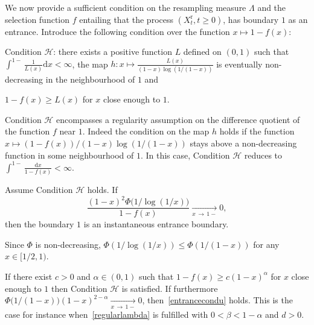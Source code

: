 \documentclass[AHL,Unicode,longabstracts,published]{cedram}
\newcommand{\ddr}{\mathrm{d}}
\newcommand{\rmr}{\mathrm{r}}
\newcommand{\clH}{\mathcal{H}}
\begin{document}
We now provide a sufficient condition on the resampling measure $\Lambda$ and the selection function $f$ entailing that the process $(X_t^{\rmr},t\geq 0)$, has boundary $1$ as an entrance. Introduce the following condition over the function $x\mapsto 1-f(x)$:

\begin{enonce*}{Condition}
$\clH$: there exists a positive function $L$ defined on $(0,1)$ such that $\int^{1-} \frac{1}{L(x)}\ddr x<\infty$, the map $h:x\mapsto \frac{L(x)}{(1-x)\log\left(1/(1-x)\right)}$ is eventually non-decreasing in the neighbourhood of $1$ and
\begin{center} 
$1-f(x)\geq L(x)$ for $x$ close enough to $1$.
\end{center}
\end{enonce*}

\begin{rema}
Condition $\clH$ encompasses a regularity assumption on the difference quotient of the function $f$ near $1$. Indeed the condition on the map $h$ holds if the function $x\mapsto (1-f(x))/(1-x)\log(1/(1-x))$ stays above a non-decreasing function in some neighbourhood of $1$. In this case, Condition $\clH$ reduces to $\int^{1-}\frac{\ddr x}{1-f(x)}<\infty$.
\end{rema}

\begin{theo}\label{theorementrancef}
Assume Condition $\clH$ holds.
If
\begin{equation}\label{entrancecondu}
\frac{(1-x)^2\Phi\big(1/\log(1/x)\big)}{1-f(x)}\underset{x\,\rightarrow\,1-}{\longrightarrow} 0,
\end{equation}
then the boundary $1$ is an instantaneous entrance boundary.
\end{theo}


\begin{rema}
Since $\Phi$ is non-decreasing, $\Phi(1/\log(1/x))\leq \Phi(1/(1-x))$ for any $x\in [1/2,1)$.
\end{rema}

\begin{exam}
If there exist $c>0$ and $\alpha \in (0,1)$ such that $1-f(x)\geq c(1-x)^{\alpha}$ for $x$ close enough to $1$ then Condition $\clH$ is satisfied. If furthermore $\Phi\big(1/(1-x)\big)(1-x)^{2-\alpha}\underset{x\,\rightarrow\,1-}{\longrightarrow} 0$, then~\eqref{entrancecondu} holds. This is the case for instance when~\eqref{regularlambda} is fulfilled with $0<\beta<1-\alpha$ and $d>0$.
\end{exam}
\end{document}
